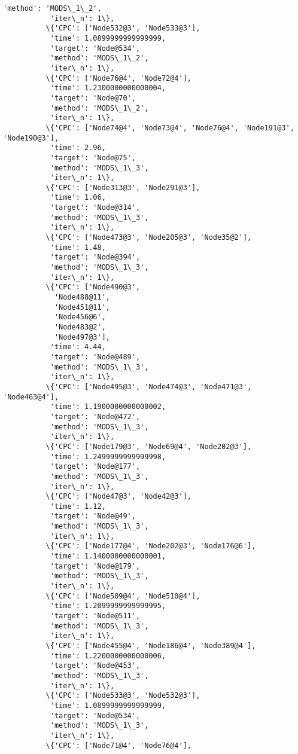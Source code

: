 \documentclass[11pt]{article}
\begin{document}
\begin{Verbatim}[commandchars=\\\{\}]
           'method': 'MODS\_1\_2',
           'iter\_n': 1\},
          \{'CPC': ['Node532@3', 'Node533@3'],
           'time': 1.0899999999999999,
           'target': 'Node@534',
           'method': 'MODS\_1\_2',
           'iter\_n': 1\},
          \{'CPC': ['Node76@4', 'Node72@4'],
           'time': 1.2300000000000004,
           'target': 'Node@70',
           'method': 'MODS\_1\_2',
           'iter\_n': 1\},
          \{'CPC': ['Node74@4', 'Node73@4', 'Node76@4', 'Node191@3', 'Node190@3'],
           'time': 2.96,
           'target': 'Node@75',
           'method': 'MODS\_1\_3',
           'iter\_n': 1\},
          \{'CPC': ['Node313@3', 'Node291@3'],
           'time': 1.06,
           'target': 'Node@314',
           'method': 'MODS\_1\_3',
           'iter\_n': 1\},
          \{'CPC': ['Node473@3', 'Node205@3', 'Node35@2'],
           'time': 1.48,
           'target': 'Node@394',
           'method': 'MODS\_1\_3',
           'iter\_n': 1\},
          \{'CPC': ['Node490@3',
            'Node488@11',
            'Node451@11',
            'Node456@6',
            'Node483@2',
            'Node497@3'],
           'time': 4.44,
           'target': 'Node@489',
           'method': 'MODS\_1\_3',
           'iter\_n': 1\},
          \{'CPC': ['Node495@3', 'Node474@3', 'Node471@3', 'Node463@4'],
           'time': 1.1900000000000002,
           'target': 'Node@472',
           'method': 'MODS\_1\_3',
           'iter\_n': 1\},
          \{'CPC': ['Node179@3', 'Node69@4', 'Node202@3'],
           'time': 1.2499999999999998,
           'target': 'Node@177',
           'method': 'MODS\_1\_3',
           'iter\_n': 1\},
          \{'CPC': ['Node47@3', 'Node42@3'],
           'time': 1.12,
           'target': 'Node@49',
           'method': 'MODS\_1\_3',
           'iter\_n': 1\},
          \{'CPC': ['Node177@4', 'Node202@3', 'Node176@6'],
           'time': 1.1400000000000001,
           'target': 'Node@179',
           'method': 'MODS\_1\_3',
           'iter\_n': 1\},
          \{'CPC': ['Node509@4', 'Node510@4'],
           'time': 1.2099999999999995,
           'target': 'Node@511',
           'method': 'MODS\_1\_3',
           'iter\_n': 1\},
          \{'CPC': ['Node455@4', 'Node186@4', 'Node389@4'],
           'time': 1.2200000000000006,
           'target': 'Node@453',
           'method': 'MODS\_1\_3',
           'iter\_n': 1\},
          \{'CPC': ['Node533@3', 'Node532@3'],
           'time': 1.0899999999999999,
           'target': 'Node@534',
           'method': 'MODS\_1\_3',
           'iter\_n': 1\},
          \{'CPC': ['Node71@4', 'Node76@4'],

\end{Verbatim}
\end{document}
